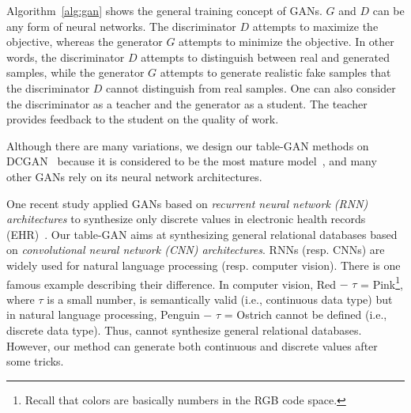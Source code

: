 
Algorithm~\ref{alg:gan} shows the general training concept of GANs. $G$ and $D$ can be any form of neural networks. The discriminator $D$ attempts to maximize the objective, whereas the generator $G$ attempts to minimize the objective. In other words, the discriminator $D$ attempts to distinguish between real and generated samples, while the generator $G$ attempts to generate realistic fake samples that the discriminator $D$ cannot distinguish from real samples. One can also consider the discriminator as a teacher and the generator as a student. The teacher provides feedback to the student on the quality of work.


Although there are many variations, we design our table-GAN methods on DCGAN~\cite{radford_dcgan_2015} because it is considered to be the most mature model~\cite{DBLP:journals/corr/ArjovskyB17}, and many other GANs rely on its neural network architectures. 

One recent study applied GANs based on \emph{recurrent neural network (RNN) architectures} to synthesize only discrete values in electronic health records (EHR)~\cite{DBLP:journals/corr/ChoiBMDSS17}. Our table-GAN aims at synthesizing general relational databases based on \emph{convolutional neural network (CNN) architectures}. RNNs (resp. CNNs) are widely used for natural language processing (resp. computer vision). There is one famous example describing their difference. In computer vision, Red $-$ $\tau$ = Pink\footnote{Recall that colors are basically numbers in the RGB code space.}, where $\tau$ is a small number, is semantically valid (i.e., continuous data type) but in natural language processing, Penguin $-$ $\tau$ = Ostrich cannot be defined (i.e., discrete data type). Thus, \cite{DBLP:journals/corr/ChoiBMDSS17} cannot synthesize general relational databases. However, our method can generate both continuous and discrete values after some tricks.